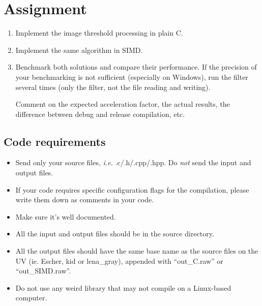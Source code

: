 \documentclass[10pt,a4paper]{article}
\theoremstyle{definition}%
\begin{document}
\section*{Assignment}
\begin{enumerate}
	\item Implement the image threshold processing in plain C.
	\item Implement the same algorithm in SIMD.
	\item Benchmark both solutions and compare their performance.
	If the precision of your benchmarking is not sufficient (especially on Windows), run the filter several times (only the filter, not the file reading and writing).

	Comment on the expected acceleration factor, the actual results, the difference between debug and release compilation, etc.
\end{enumerate}

\subsection*{Code requirements}

\begin{itemize}
	\item Send only your source files, \textit{i.e.} .c/.h/.cpp/.hpp. Do \textit{not} send the input and output files.
	\item If your code requires specific configuration flags for the compilation, please write them down as comments in your code.
	\item Make sure it's well documented.
	\item All the input and output files should be in the source directory.
	\item All the output files should have the same base name as the source files on the UV (ie. Escher, kid or lena\_gray), appended with ``out\_C.raw'' or ``out\_SIMD.raw''.
	\item Do not use any weird library that may not compile on a Linux-based computer.
\end{itemize}
\end{document}
